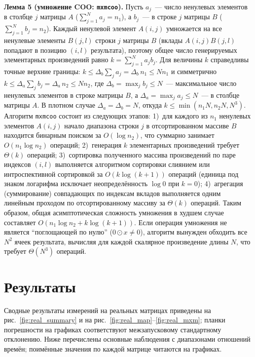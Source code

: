 \documentclass[a4paper]{article}
\begin{document}
\textbf{Лемма 5 (умножение COO: \texttt{mxmcoo}).}
Пусть $a_j$~--- число ненулевых элементов в столбце $j$ матрицы $A$ ($\sum_{j=1}^N a_j = n_1$), а $b_j$~--- в строке $j$ матрицы $B$ ($\sum_{j=1}^N b_j = n_2$). Каждый ненулевой элемент $A(i,j)$ умножается на все ненулевые элементы $B(j,l)$ строки $j$ матрицы $B$ (вклады $A(i,j)B(j,l)$ попадают в позицию $(i,l)$ результата), поэтому общее число генерируемых элементарных произведений равно $k=\sum_{j=1}^{N}a_j b_j$.
Для величины $k$ справедливы точные верхние границы: $k\le \Delta_b\sum_j a_j=\Delta_b\,n_1 \le N n_1$ и симметрично $k\le \Delta_a\sum_j b_j=\Delta_a\,n_2 \le N n_2$, где $\Delta_b=\max_j b_j \le N$~--- максимальное число ненулевых элементов в строке матрицы $B$, а $\Delta_a=\max_j a_j \le N$~--- в столбце матрицы $A$. В плотном случае $\Delta_a=\Delta_b=N$, откуда $k \le \min(n_1 N, n_2 N, N^3)$.
Алгоритм \texttt{mxmcoo} состоит из следующих этапов: 1)~для каждого из $n_1$ ненулевых элементов $A(i,j)$ начало диапазона строки $j$ в отсортированном массиве $B$ находится бинарным поиском за $O(\log n_2)$, что суммарно занимает $O(n_1 \log n_2)$ операций; 2)~генерация $k$ элементарных произведений требует $\Theta(k)$ операций; 3)~сортировка полученного массива произведений по паре индексов $(i,l)$ выполняется алгоритмом сортировки слиянием или интроспективной сортировкой за $O(k \log(k + 1))$ операций (единица под знаком логарифма исключает неопределённость $\log 0$ при $k = 0$); 4)~агрегация (суммирование) совпадающих по индексам вкладов выполняется одним линейным проходом по отсортированному массиву за $\Theta(k)$ операций.
Таким образом, общая асимптотическая сложность умножения в худшем случае составляет $O(n_1\log n_2 + k\log(k+1))$. Если операция умножения не является \enquote{поглощающей по нулю} ($0 \odot x \neq 0$), алгоритм вынужден обходить все $N^2$ ячеек результата, вычисляя для каждой скалярное произведение длины $N$, что требует $\Theta(N^3)$ операций.

\section{Результаты}

Сводные результаты измерений на реальных матрицах приведены на рис.~\ref{fig:real_summary} и на рис.~\ref{fig:real_map}--\ref{fig:real_mxm}; планки погрешности на графиках соответствуют межзапусковому стандартному отклонению. Ниже перечислены основные наблюдения с диапазонами отношений времён; поимённые значения по каждой матрице читаются на графиках.
\end{document}
